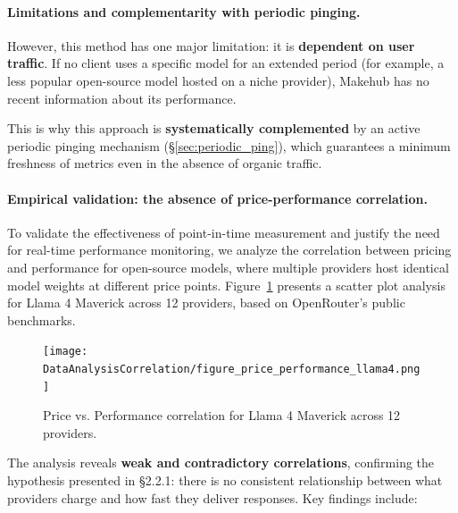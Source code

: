 \documentclass[english]{article}
\begin{document}
\paragraph{Limitations and complementarity with periodic pinging.}

However, this method has one major limitation: it is \textbf{dependent on user traffic}. If no client uses a specific model for an extended period (for example, a less popular open-source model hosted on a niche provider), Makehub has no recent information about its performance.

This is why this approach is \textbf{systematically complemented} by an active periodic pinging mechanism (\S\ref{sec:periodic_ping}), which guarantees a minimum freshness of metrics even in the absence of organic traffic.

\paragraph{Empirical validation: the absence of price-performance correlation.}

To validate the effectiveness of point-in-time measurement and justify the need for real-time performance monitoring, we analyze the correlation between pricing and performance for open-source models, where multiple providers host identical model weights at different price points. Figure~\ref{fig:price_latency_correlation} presents a scatter plot analysis for Llama 4 Maverick across 12 providers, based on OpenRouter's public benchmarks.

\begin{figure}[H]
\centering
\texttt{[image: DataAnalysisCorrelation/figure\_price\_performance\_llama4.png]}
\caption{Price vs. Performance correlation for Llama 4 Maverick across 12 providers.}
\label{fig:price_latency_correlation}
\end{figure}

The analysis reveals \textbf{weak and contradictory correlations}, confirming the hypothesis presented in §2.2.1: there is no consistent relationship between what providers charge and how fast they deliver responses. Key findings include:
\end{document}
